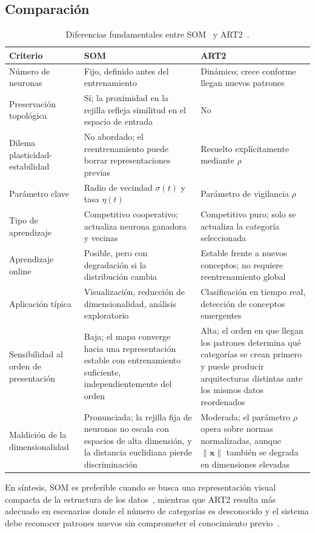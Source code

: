 \subsection{Comparación}

\begin{table}[H]
\centering
\caption{Diferencias fundamentales entre SOM~\cite{kohonen1990som} y ART2~\cite{carpenter1987art2}.}
\label{tab:som_art}
\begin{tabular}{p{3.4cm} p{4.9cm} p{4.9cm}}
\toprule
\textbf{Criterio} & \textbf{SOM} & \textbf{ART2} \\
\midrule
Número de neuronas
  & Fijo, definido antes del entrenamiento
  & Dinámico; crece conforme llegan nuevos patrones \\[4pt]
Preservación topológica
  & Sí; la proximidad en la rejilla refleja similitud en el espacio de entrada
  & No \\[4pt]
Dilema plasticidad-estabilidad
  & No abordado; el reentrenamiento puede borrar representaciones previas
  & Resuelto explícitamente mediante $\rho$ \\[4pt]
Parámetro clave
  & Radio de vecindad $\sigma(t)$ y tasa $\eta(t)$
  & Parámetro de vigilancia $\rho$ \\[4pt]
Tipo de aprendizaje
  & Competitivo cooperativo; actualiza neurona ganadora y vecinas
  & Competitivo puro; solo se actualiza la categoría seleccionada \\[4pt]
Aprendizaje online
  & Posible, pero con degradación si la distribución cambia
  & Estable frente a nuevos conceptos; no requiere reentrenamiento global \\[4pt]
Aplicación típica
  & Visualización, reducción de dimensionalidad, análisis exploratorio
  & Clasificación en tiempo real, detección de conceptos emergentes \\[4pt]
Sensibilidad al orden de presentación
  & Baja; el mapa converge hacia una representación estable con entrenamiento suficiente, independientemente del orden
  & Alta; el orden en que llegan los patrones determina qué categorías se crean primero y puede producir arquitecturas distintas ante los mismos datos reordenados \\[4pt]
Maldición de la dimensionalidad
  & Pronunciada; la rejilla fija de neuronas no escala con espacios de alta dimensión, y la distancia euclidiana pierde discriminación~\cite{aggarwal2001surprising}
  & Moderada; el parámetro $\rho$ opera sobre normas normalizadas, aunque $\|\mathbf{x}\|$ también se degrada en dimensiones elevadas \\
\bottomrule
\end{tabular}
\end{table}

En síntesis, SOM es preferible cuando se busca una representación visual compacta de la estructura de los datos~\cite{kohonen1990som}, mientras que ART2 resulta más adecuado en escenarios donde el número de categorías es desconocido y el sistema debe reconocer patrones nuevos sin comprometer el conocimiento previo~\cite{carpenter1987art2,grossberg1987competitive}.